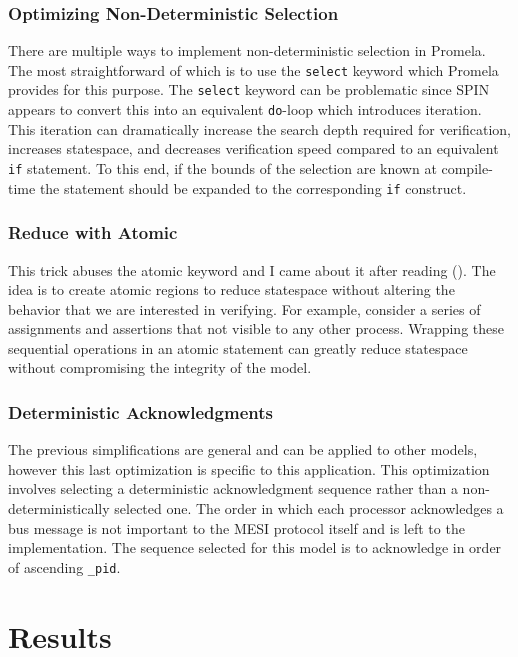 \documentclass[12pt]{article}
\begin{document}
\subsubsection{Optimizing Non-Deterministic Selection}

There are multiple ways to implement non-deterministic selection in Promela. The most straightforward of which is to use the \texttt{select} keyword which Promela provides for this purpose. The \texttt{select} keyword can be problematic since SPIN appears to convert this into an equivalent \texttt{do}-loop which introduces iteration. This iteration can dramatically increase the search depth required for verification, increases statespace, and decreases verification speed compared to an equivalent \texttt{if} statement. To this end, if the bounds of the selection are known at compile-time the statement should be expanded to the corresponding \texttt{if} construct.

\subsubsection{Reduce with Atomic}

This trick abuses the atomic keyword and I came about it after reading (\cite{mckenney2007}).  The idea is to create atomic regions to reduce statespace without altering the behavior that we are interested in verifying. For example, consider a series of assignments and assertions that not visible to any other process. Wrapping these sequential operations in an atomic statement can greatly reduce statespace without compromising the integrity of the model.

\subsubsection{Deterministic Acknowledgments}

The previous simplifications are general and can be applied to other models, however this last optimization is specific to this application. This optimization involves selecting a deterministic acknowledgment sequence rather than a non-deterministically selected one. The order in which each processor acknowledges a bus message is not important to the MESI protocol itself and is left to the implementation. The sequence selected for this model is to acknowledge in order of ascending \texttt{\_pid}.


\section{Results} \label{results}
\end{document}
